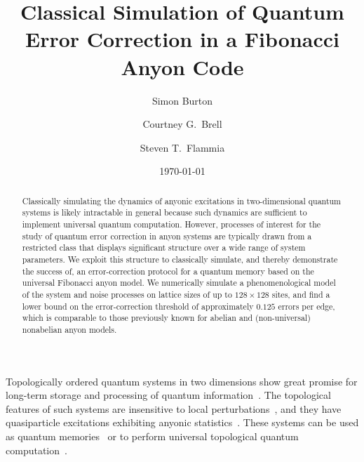 \documentclass[aps, prl, letterpaper, twocolumn, superscriptaddress, notitlepage, 10pt]{revtex4-1}
\begin{document}
\title{Classical Simulation of Quantum Error Correction in a Fibonacci Anyon Code}

\author{Simon Burton}
\author{Courtney G.\ Brell}
\author{Steven T.\ Flammia}

\date{\today}

\begin{abstract}
Classically simulating the dynamics of anyonic excitations in two-dimensional quantum systems is likely intractable in general because such dynamics are sufficient to implement 
universal quantum computation. However, processes of interest for the study of quantum 
error correction in anyon systems are typically drawn from a restricted class that displays 
significant structure over a wide range of system parameters.
We exploit this structure to classically simulate, and thereby demonstrate the success of, an 
error-correction protocol for a quantum memory based on the universal Fibonacci anyon 
model.  We numerically simulate a phenomenological model of the system and noise 
processes on lattice sizes of up to 
$128\times128$ sites, and find a lower bound on the error-correction threshold of 
approximately $0.125$ errors per edge, which is comparable to those previously known for abelian and 
(non-universal) nonabelian anyon models.
\end{abstract}

\maketitle


Topologically ordered quantum systems in two dimensions show great promise for 
long-term storage and processing of quantum information~\cite{Kitaev2003, Dennis2002, Nayak2008}. 
The topological features of such systems are insensitive to local 
perturbations~\cite{Bravyi2010, Bravyi2011a, Michalakis2013}, and they have quasiparticle excitations 
exhibiting anyonic statistics~\cite{Wilczek1990}. These systems can be used as 
quantum memories~\cite{Kitaev2003, Dennis2002} or to perform universal topological 
quantum computation~\cite{Freedman2002, Nayak2008}.
\end{document}
